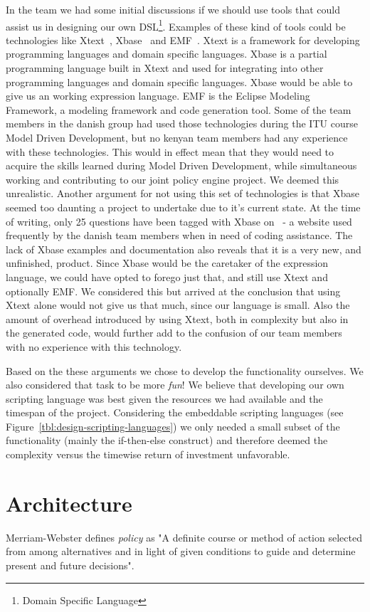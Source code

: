 In the team we had some initial discussions if we should use tools that could assist us in designing our own DSL\footnote{Domain Specific Language}. Examples of these kind of tools could be technologies like Xtext~\cite{xtext}, Xbase~\cite{xbase} and EMF~\cite{emf}. Xtext is a framework for developing programming languages and domain specific languages. Xbase is a partial programming language built in Xtext and used for integrating into other programming languages and domain specific languages. Xbase would be able to give us an working expression language. EMF is the Eclipse Modeling Framework, a modeling framework and code generation tool. Some of the team members in the danish group had used those technologies during the ITU course Model Driven Development, but no kenyan team members had any experience with these technologies. This would in effect mean that they would need to acquire the skills learned during Model Driven Development, while simultaneous working and contributing to our joint policy engine project. We deemed this unrealistic. Another argument for not using this set of technologies is that Xbase seemed too daunting a project to undertake due to it's current state. At the time of writing, only 25 questions have been tagged with Xbase on~\cite{stackoverflow} - a website used frequently by the danish team members when in need of coding assistance. The lack of Xbase examples and documentation also reveals that it is a very new, and unfinished, product. Since Xbase would be the caretaker of the expression language, we could have opted to forego just that, and still use Xtext and optionally EMF. We considered this but arrived at the conclusion that using Xtext alone would not give us that much, since our language is small. Also the amount of overhead introduced by using Xtext, both in complexity but also in the generated code, would further add to the confusion of our team members with no experience with this technology. 

Based on the these arguments we chose to develop the functionality ourselves. We also considered that task to be more \textit{fun}! We believe that developing our own scripting language was best given the resources we had available and the timespan of the project. Considering the embeddable scripting languages (see Figure~\ref{tbl:design-scripting-languages}) we only needed a small subset of the functionality (mainly the if-then-else construct) and therefore deemed the complexity versus the timewise return of investment unfavorable.

\section{Architecture}
Merriam-Webster defines \textit{policy} as "A definite course or method of action selected from among alternatives and in light of given conditions to guide and determine present and future decisions".

